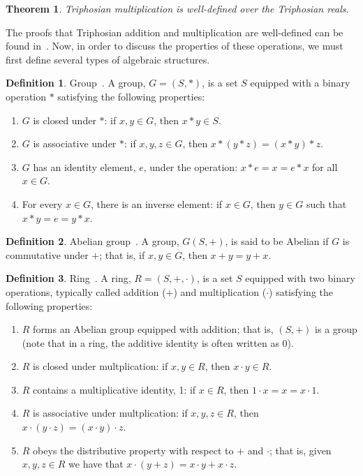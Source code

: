 \documentclass[11pt]{article}
\theoremstyle{definition}
\newtheorem{definition}{Definition}
\theoremstyle{plain}
\newtheorem{theorem}{Theorem}
\theoremstyle{remark}
\begin{document}
	\begin{theorem}
		Triphosian multiplication is well-defined over the Triphosian
		reals.~\cite{egging}
	\end{theorem}

	The proofs that Triphosian addition and multiplication are well-defined can
	be found in~\cite{egging}. Now, in order to discuss the properties of these
	operations, we must first define several types of algebraic structures.

	\begin{definition}{Group~\cite{lang}.}
		A group, \(G = (S,*)\), is a set \(S\) equipped with a binary operation
		\(*\) satisfying the following properties:
		\begin{enumerate}
			\item \(G\) is closed under \(*\): if \(x,y \in G\), then \(x*y \in
			S\).
			\item \(G\) is associative under \(*\): if \(x,y,z \in G\), then
			\(x*(y*z) = (x*y)*z\).
			\item \(G\) has an identity element, \(e\), under the operation:
			\(x*e = x = e*x\) for all \(x \in G\).
			\item For every \(x \in G\), there is an inverse element: if \(x
			\in G\), then \(y \in G\) such that \(x*y = e = y*x\).
		\end{enumerate}
	\end{definition}

	\begin{definition}{Abelian group~\cite{lang}.}
		A group, \(G(S,+)\), is said to be Abelian if \(G\) is commutative
		under \(+\); that is, if \(x,y \in G\), then \(x + y = y + x\).
	\end{definition}

	\begin{definition}{Ring~\cite{lang}.}
		A ring, \(R = (S,+,\cdot)\), is a set \(S\) equipped with two binary
		operations, typically called addition (+) and multiplication
		(\(\cdot\)) satisfying the following properties:
		\begin{enumerate}
			\item \(R\) forms an Abelian group equipped with addition; that is,
			\((S,+)\) is a group (note that in a ring, the additive identity is
			often written as 0).
			\item \(R\) is closed under multplication: if \(x,y \in R\), then
			\(x \cdot y \in R\).
			\item \(R\) contains a multiplicative identity, 1: if \(x \in R\),
			then \(1 \cdot x = x = x \cdot 1\).
			\item \(R\) is associative under multplication: if \(x,y,z \in R\),
			then \(x\cdot(y\cdot z) = (x\cdot y) \cdot z\).
			\item \(R\) obeys the distributive property with respect to \(+\)
			and \(\cdot\); that is, given \(x,y,z \in R\) we have that \(x
			\cdot (y + z) = x\cdot y + x \cdot z\).
		\end{enumerate}
	\end{definition}
\end{document}
